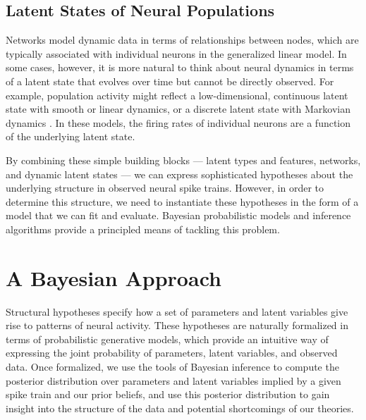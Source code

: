 
\subsection{Latent States of Neural Populations}
Networks model dynamic data in terms of relationships between nodes,
which are typically associated with individual neurons in the
generalized linear model. In some cases, however, it is more natural
to think about neural dynamics in terms of a latent state that evolves
over time but cannot be directly observed. For example, population
activity might reflect a low-dimensional, continuous latent state with
smooth \citep{Yu09} or linear \citep{Smith-2003, paninski2010new}
dynamics, or a discrete latent state with Markovian dynamics
\citep[e.g.][]{jones2007natural, latimer2015single}.  In these models,
the firing rates of individual neurons are a function of the
underlying latent state.

By combining these simple building blocks --- latent types and features, 
networks, and dynamic latent states --- we can express sophisticated 
hypotheses about the underlying structure in observed neural spike trains. 
However, in order to determine this structure, we need to instantiate these 
hypotheses in the form of a model that we can fit and evaluate.
Bayesian probabilistic models and inference algorithms provide a principled 
means of tackling this problem.


\section{A Bayesian Approach} 
Structural hypotheses specify how a set of parameters and latent
variables give rise to patterns of neural activity.  These hypotheses
are naturally formalized in terms of probabilistic generative models,
which provide an intuitive way of expressing the joint probability of
parameters, latent variables, and observed data.  Once formalized, we
use the tools of Bayesian inference to compute the posterior
distribution over parameters and latent variables implied by a given
spike train and our prior beliefs, and use this posterior distribution
to gain insight into the structure of the data and potential
shortcomings of our theories.


